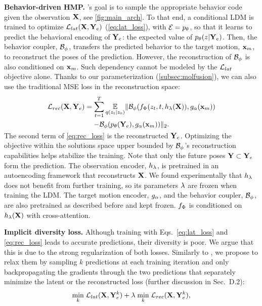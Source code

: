 \documentclass[10pt,twocolumn,letterpaper]{article}
\begin{document}
\textbf{Behavior-driven HMP.} \modelname{}'s goal is to sample the appropriate behavior code given the observation $\mathbf{X}$, see \autoref{fig:main_arch}.
To that end, a conditional LDM is trained to optimize $\mathcal{L}_{lat}(\mathbf{X},\mathbf{Y}_{e})$ (\autoref{eq:lat_loss}), with
$\mathcal{E} = p_{\theta}$, so that it learns to predict the behavioral encoding of $\mathbf{Y}_{e}$: the expected value of $p_{\theta} (z|\mathbf{Y}_{e})$.
Then, the behavior coupler, $\mathcal{B}_{\phi}$, transfers the predicted behavior to the target motion, $\mathbf{x}_{m}$, to reconstruct the poses of the prediction. 
However, the reconstruction of $\mathcal{B}_{\phi}$ is also conditioned on $\mathbf{x}_{m}$. Such dependency cannot be modeled by the $\mathcal{L}_{lat}$ objective alone. Thanks to our parameterization (\autoref{subsec:molfusion}), we can also use the traditional MSE loss in the reconstruction space:
\vspace{-0.3cm}
\begin{equation}
\label{eq:rec_loss}
\begin{gathered}
    \lossrec(\obs, \extPred)= 
    \sum^T_{t=1}
    \underset{q(z_t|z_0)}{\mathbb{E}}
    \|\bvaeDec(\ldFunction(z_t, t, \vaeObsEnc(\obs)), \bvaeXmotionEnc(\xmotion)) \\ - \bvaeDec(\bvaeEnc(\extPred), \bvaeXmotionEnc(\xmotion))\|_{2}.
    \vspace{-0.3cm}
\end{gathered}
\end{equation}



The second term of \autoref{eq:rec_loss} is the reconstructed $\mathbf{Y}_{e}$. Optimizing the objective within the solutions space upper bounded by $\mathcal{B}_{\phi}$'s reconstruction capabilities helps stabilize the training. Note that only the future poses $\mathbf{Y} \subset \mathbf{Y}_{e}$ form the prediction.
The observation encoder, $h_{\lambda}$, is pretrained in an autoencoding framework that reconstructs $\mathbf{X}$. We found experimentally that $h_{\lambda}$ does not benefit from further training, so its parameters $\lambda$ are frozen when training the LDM. The target motion encoder, $g_{\alpha}$, and the behavior coupler, $\mathcal{B}_{\phi}$, are also pretrained as described before and kept frozen. $f_{\Phi}$ is conditioned on $h_{\lambda}(\mathbf{X})$ with cross-attention.





\textbf{Implicit diversity loss.} Although training \modelname{} with Eqs.~\ref{eq:lat_loss} and \ref{eq:rec_loss} leads to accurate predictions, their diversity is poor. We argue that this is due to the strong regularization of both losses. Similarly to \cite{fan2017point, gupta2018social}, we propose to relax them by sampling $k$ predictions at each training iteration and only backpropagating the gradients through the two predictions that separately minimize the latent or the reconstructed loss (further discussion in \supp{} Sec.~D.2):
\vspace{-0.2cm}
\begin{equation}
    \label{eq:final_loss}
\underset{k}{\min}\; \losslat(\obs, \extPred^k) + \lambda \; \underset{k}{\min}\; \lossrec(\obs, \extPred^k),
    \vspace{-0.2cm}
\end{equation}
\end{document}
